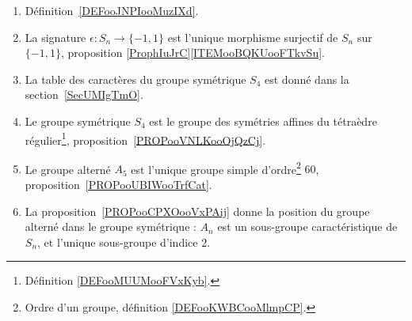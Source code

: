 
       \label{THEMEooQEEWooXDhvhv}

\begin{enumerate}
	\item
	      Définition~\ref{DEFooJNPIooMuzIXd}.
	\item
	      La signature \( \epsilon\colon S_n\to \{ -1,1 \}\) est l'unique morphisme surjectif de \( S_n\) sur \( \{ -1,1 \}\), proposition \ref{ProphIuJrC}\ref{ITEMooBQKUooFTkvSu}.
	\item
	      La table des caractères du groupe symétrique \( S_4\) est donné dans la section~\ref{SecUMIgTmO}.
	\item
	      Le groupe symétrique \( S_4\) est le groupe des symétries affines du tétraèdre régulier\footnote{Définition \ref{DEFooMUUMooFVxKyb}.}, proposition~\ref{PROPooVNLKooOjQzCj}.
	\item
	      Le groupe alterné \( A_5\) est l'unique groupe simple d'ordre\footnote{Ordre d'un groupe, définition \ref{DEFooKWBCooMlmpCP}.} \( 60\), proposition~\ref{PROPooUBIWooTrfCat}.
	\item
	      La proposition~\ref{PROPooCPXOooVxPAij} donne la position du groupe alterné dans le groupe symétrique : \( A_n\) est un sous-groupe caractéristique de \( S_n\), et l'unique sous-groupe d'indice \( 2\).
\end{enumerate}
